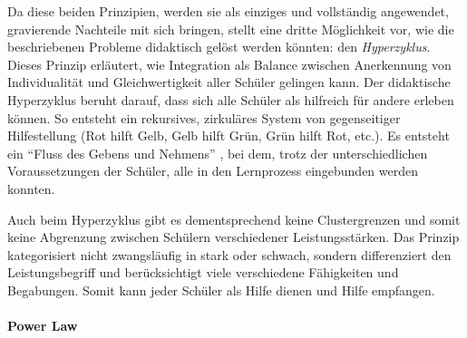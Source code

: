 Da diese beiden Prinzipien, werden sie als einziges und vollständig angewendet, gravierende Nachteile mit sich bringen, stellt \citeauthor{Zimpel2012} eine dritte Möglichkeit vor, wie die beschriebenen Probleme didaktisch gelöst werden könnten: den \emph{Hyperzyklus}.
Dieses Prinzip erläutert, wie Integration als Balance zwischen Anerkennung von Individualität und Gleichwertigkeit aller Schüler gelingen kann.
Der didaktische Hyperzyklus beruht darauf, dass sich alle Schüler als hilfreich für andere erleben können.
So entsteht ein rekursives, zirkuläres System von gegenseitiger Hilfestellung (Rot hilft Gelb, Gelb hilft Grün, Grün hilft Rot, etc.).
Es entsteht ein ``Fluss des Gebens und Nehmens'' \parencite[125]{Zimpel2012}, bei dem, trotz der unterschiedlichen Voraussetzungen der Schüler, alle in den Lernprozess eingebunden werden konnten.

Auch beim Hyperzyklus gibt es dementsprechend keine Clustergrenzen und somit keine Abgrenzung zwischen Schülern verschiedener Leistungsstärken.
Das Prinzip kategorisiert nicht zwangsläufig in stark oder schwach, sondern differenziert den Leistungsbegriff und berücksichtigt viele verschiedene Fähigkeiten und Begabungen.
Somit kann jeder Schüler als Hilfe dienen und Hilfe empfangen.

\paragraph{Power Law}

